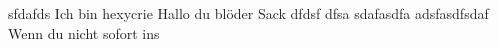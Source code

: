 \documentclass{article}
\date{}
\begin{document}
 
  sfdafds 
Ich bin hexycrie 
Hallo du blöder Sack  dfdsf dfsa
sdafasdfa
adsfasdfsdaf
 Wenn du nicht sofort ins
 
  
\end{document}

